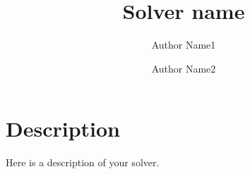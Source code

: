 \documentclass{article}
\title{Solver name}
\author[1]{Author Name1}
\author[1,2]{Author Name2}
\affil[1]{Affiliation1}
\affil[2]{Affiliation2}
\begin{document}
\maketitle

\section{Description}
Here is a description of your solver.
\end{document}
